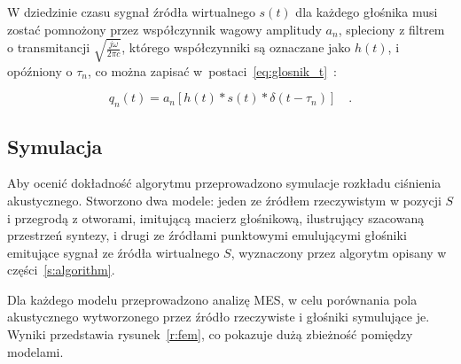 \documentclass[12pt]{oska}
\let\Oldsubsection\subsection
\renewcommand{\subsection}{\FloatBarrier\Oldsubsection}
\begin{document}
W dziedzinie czasu sygnał źródła wirtualnego $s(t)$ dla każdego głośnika musi
zostać pomnożony przez współczynnik wagowy amplitudy $a_n$, spleciony z filtrem
o transmitancji $\sqrt{\frac{j\omega}{2\pi c}}$, którego współczynniki są
oznaczane jako $h(t)$, i opóźniony o $\tau_n$, co można zapisać
w~postaci~\eqref{eq:glosnik_t}~\cite{enhancement}:

\begin{equation}
  q_n(t) = a_n\left[h(t)*s(t)*\delta(t-\tau_n)\right] \quad. \label{eq:glosnik_t}
\end{equation}

\subsection{Symulacja}

Aby ocenić dokładność algorytmu przeprowadzono symulacje rozkładu ciśnienia
akustycznego.  Stworzono dwa modele: jeden ze źródłem rzeczywistym w pozycji
$S$ i przegrodą z otworami, imitującą macierz głośnikową, ilustrujący szacowaną
przestrzeń syntezy, i drugi ze źródłami punktowymi emulującymi głośniki
emitujące sygnał ze źródła wirtualnego $S$, wyznaczony przez algorytm opisany w
części~\ref{s:algorithm}.

Dla każdego modelu przeprowadzono analizę MES, w celu porównania pola
akustycznego wytworzonego przez źródło rzeczywiste i głośniki symulujące je.
Wyniki przedstawia rysunek~\ref{r:fem}, co pokazuje dużą zbieżność pomiędzy
modelami.
\end{document}
